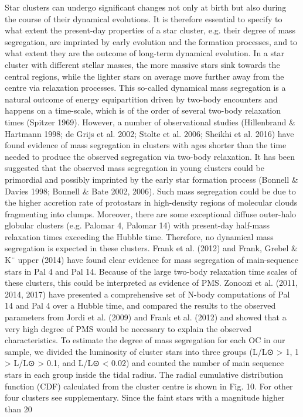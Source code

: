 \documentclass[../main.tex]{subfiles}
\begin{document}
{Star clusters can undergo significant changes not only at birth but
also during the course of their dynamical evolutions. It is therefore
essential to specify to what extent the present-day properties of a star
cluster, e.g. their degree of mass segregation, are imprinted by early
evolution and the formation processes, and to what extent they are
the outcome of long-term dynamical evolution.
In a star cluster with different stellar masses, the more massive
stars sink towards the central regions, while the lighter stars on
average move further away from the centre via relaxation processes.
This so-called dynamical mass segregation is a natural outcome of
energy equipartition driven by two-body encounters and happens on
a time-scale, which is of the order of several two-body relaxation
times (Spitzer 1969).
However, a number of observational studies (Hillenbrand \&
Hartmann 1998; de Grijs et al. 2002; Stolte et al. 2006; Sheikhi et al.
2016) have found evidence of mass segregation in clusters with ages
shorter than the time needed to produce the observed segregation via
two-body relaxation.
It has been suggested that the observed mass segregation in young
clusters could be primordial and possibly imprinted by the early star
formation process (Bonnell \& Davies 1998; Bonnell \& Bate 2002,
2006).
Such mass segregation could be due to the higher accretion rate of
protostars in high-density regions of molecular clouds fragmenting
into clumps.
Moreover, there are some exceptional diffuse outer-halo globular
clusters (e.g. Palomar 4, Palomar 14) with present-day half-mass
relaxation times exceeding the Hubble time. Therefore, no dynamical
mass segregation is expected in these clusters. Frank et al. (2012) and
Frank, Grebel \& K¨
upper (2014) have found clear evidence for mass
segregation of main-sequence stars in Pal 4 and Pal 14. Because of
the large two-body relaxation time scales of these clusters, this could
be interpreted as evidence of PMS. Zonoozi et al. (2011, 2014, 2017)
have presented a comprehensive set of N-body computations of Pal
14 and Pal 4 over a Hubble time, and compared the results to the
observed parameters from Jordi et al. (2009) and Frank et al. (2012)
and showed that a very high degree of PMS would be necessary to
explain the observed characteristics.
To estimate the degree of mass segregation for each OC in our
sample, we divided the luminosity of cluster stars into three groups
(L/L⊙ > 1, 1 > L/L⊙ > 0.1, and L/L⊙ < 0.02) and counted the
number of main sequence stars in each group inside the tidal radius.
The radial cumulative distribution function (CDF) calculated from
the cluster centre is shown in Fig. 10. For other four clusters see
supplementary. Since the faint stars with a magnitude higher than 20

}
\end{document}
